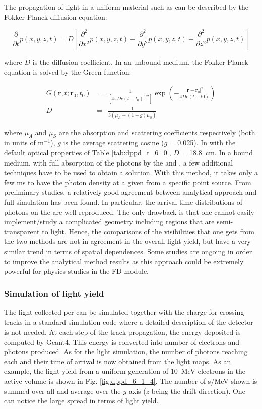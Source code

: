 The propagation of light in a uniform material such as \lar can be described by the Fokker-Planck diffusion equation:

$$\frac{\partial}{\partial t}p(x,y,z,t) = D\left[\frac{\partial^2}{\partial x^2}p(x,y,z,t) + \frac{\partial^2}{\partial y^2}p(x,y,z,t) + \frac{\partial^2}{\partial z^2}p(x,y,z,t)\right]$$ 

where $D$ is the diffusion coefficient. In an unbound medium, the Fokker-Planck equation is solved by the Green function:

\begin{eqnarray*}
G(\textbf{r}, t; \textbf{r}_0, t_0) &=& \frac{1}{[4\pi D c (t-t_0)^{3/2}]}\exp\left(-\frac{|\textbf{r}-\textbf{r}_0|^2}{4Dc(t-t0)}\right) \\
D &=& \frac{1}{3(\mu_A + (1-g)\mu_S)}
\end{eqnarray*}

where $\mu_A$ and $\mu_S$ are the absorption and scattering coefficients respectively (both in units of m$^{-1}$), $g$ is the average scattering cosine ($g$ = \num{0.025}). In \lar with the default optical properties of Table \ref{tab:dppd_t_6_0}, $D$ = \SI{18.8}{\cm}. In a bound medium, with full absorption of the photons by the  and , a few additional techniques have to be used to obtain a solution. With this method, it takes only a few ms to have the photon density at a given  from a specific point source. From preliminary studies, a relatively good agreement between analytical approach and full simulation has been found. In particular, the arrival time distributions of photons on the  are well reproduced. The only drawback is that one cannot easily implement/study a complicated geometry including regions that are semi-transparent to light. Hence, the comparisons of the visibilities that one gets from the two methods are not in agreement in the overall light yield, but have a very similar trend in terms of spatial dependences. Some studies are ongoing in order to improve the analytical method results as this approach could be extremely powerful for physics studies in the FD module.

\subsubsection{Simulation of light yield}
\label{subsec:fddp-pd-6.1.4}
The light collected per  can be simulated together with the charge for crossing tracks in a standard simulation code where a detailed description of the detector is not needed. At each step of the track propagation, the energy deposited is computed by Geant4. This energy is converted into number of electrons and photons produced. As for the light simulation, the number of photons reaching each  and their time of arrival is now obtained from the light maps. As an example, the light yield from a uniform generation of \SI{10}{MeV} electrons in the active volume is shown in Fig. \ref{fig:dppd_6_1_4}. The number of \phel{}s/MeV shown is summed over all  and average over the $y$ axis ($z$ being the drift direction). One can notice the large spread in terms of light yield.

